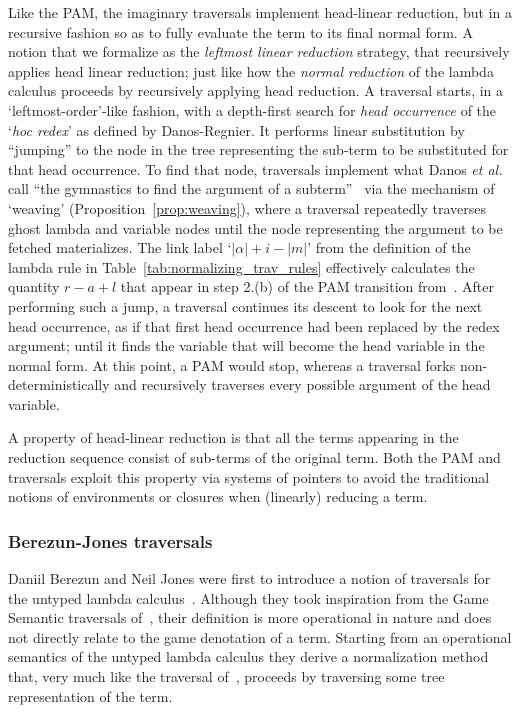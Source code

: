 \documentclass{elsarticle}
\makeatletter
\theoremstyle{plain}
\theoremstyle{definition}
\theoremstyle{remark}
\def\etal{\textit{et al.}\@\xspace}
\makeatother
\begin{document}
Like the PAM, the imaginary traversals implement head-linear reduction, but in a recursive fashion so as to fully evaluate the term to its final normal form.
A notion that we formalize as the \emph{leftmost linear reduction} strategy, that recursively applies head linear reduction; just like how the \emph{normal reduction} of the lambda calculus proceeds by recursively applying head reduction.
A traversal starts, in a `leftmost-order'-like fashion, with a depth-first search for \emph{head occurrence} of the `\emph{hoc redex}' as defined by Danos-Regnier. It performs linear substitution by ``jumping'' to the node in the tree representing the sub-term to be substituted for that head occurrence.
To find that node, traversals implement what Danos \etal call ``the gymnastics to find the argument of a subterm''~\cite{danos-head} via the mechanism of `weaving' (Proposition~\ref{prop:weaving}),
where a traversal repeatedly traverses ghost lambda and variable nodes until the node representing the argument to be fetched materializes.
The link label `$|\alpha|+i-|m|$' from the definition
of the lambda rule in Table~\ref{tab:normalizing_trav_rules} effectively calculates the quantity $r-a+l$ that appear in step 2.(b) of the PAM transition from~\cite{danos-head}.
After performing such a jump, a traversal continues its descent to look for the next head occurrence, as if that first head occurrence had been replaced by the redex argument; until it finds the variable that will become the head variable in the normal form. At this point, a PAM would stop, whereas a traversal forks  non-deterministically and recursively traverses every possible argument of the head variable.

A property of head-linear reduction is that all the terms appearing in the reduction sequence consist of sub-terms of the original term.
Both the PAM and traversals exploit this property via systems of pointers to avoid the traditional notions of environments or closures when (linearly) reducing a term.

\subsubsection{Berezun-Jones traversals}

Daniil Berezun and Neil Jones were first to introduce a notion of traversals for the untyped lambda calculus~\cite{JonesBerezunLLL-PEPM17}.
Although they took inspiration from the Game Semantic traversals of~\cite{OngLics2006,BlumGalop2008}, their definition is more operational in nature and does not directly relate to the game denotation of a term. Starting from an operational semantics of the untyped lambda calculus they derive a normalization method that, very much like the traversal of~\cite{OngLics2006, BlumPhd}, proceeds by traversing some tree representation of the term.
\end{document}

